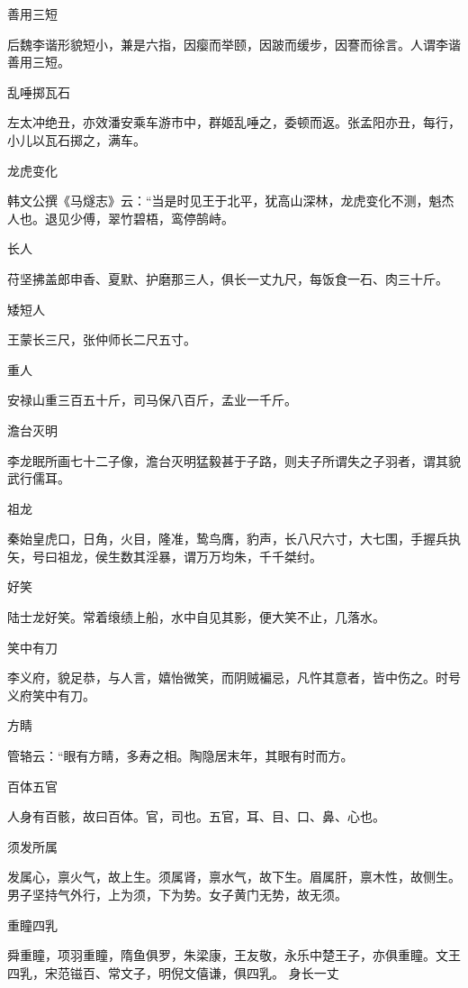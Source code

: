 \documentclass[a4paper,12pt,UTF8,twoside]{ctexbook}
\begin{document}
    善用三短
    
    后魏李谐形貌短小，兼是六指，因瘿而举颐，因跛而缓步，因謇而徐言。人谓李谐善用三短。
    
    乱唾掷瓦石
    
    左太冲绝丑，亦效潘安乘车游市中，群姬乱唾之，委顿而返。张孟阳亦丑，每行，小儿以瓦石掷之，满车。
    
    龙虎变化
    
    韩文公撰《马燧志》云：“当是时见王于北平，犹高山深林，龙虎变化不测，魁杰人也。退见少傅，翠竹碧梧，鸾停鹄峙。
    
    长人
    
    苻坚拂盖郎申香、夏默、护磨那三人，俱长一丈九尺，每饭食一石、肉三十斤。
    
    矮短人
    
    王蒙长三尺，张仲师长二尺五寸。
    
    重人
    
    安禄山重三百五十斤，司马保八百斤，孟业一千斤。
    
    澹台灭明
    
    李龙眠所画七十二子像，澹台灭明猛毅甚于子路，则夫子所谓失之子羽者，谓其貌武行儒耳。
    
    祖龙
    
    秦始皇虎口，日角，火目，隆准，鸷鸟膺，豹声，长八尺六寸，大七围，手握兵执矢，号曰祖龙，侯生数其淫暴，谓万万均朱，千千桀纣。
    
    好笑
    
    陆士龙好笑。常着缞绩上船，水中自见其影，便大笑不止，几落水。
    
    笑中有刀
    
    李义府，貌足恭，与人言，嬉怡微笑，而阴贼褊忌，凡忤其意者，皆中伤之。时号义府笑中有刀。
    
    方睛
    
    管辂云：“眼有方睛，多寿之相。陶隐居末年，其眼有时而方。
    
    百体五官
    
    人身有百骸，故曰百体。官，司也。五官，耳、目、口、鼻、心也。
    
    须发所属
    
    发属心，禀火气，故上生。须属肾，禀水气，故下生。眉属肝，禀木性，故侧生。男子坚持气外行，上为须，下为势。女子黄门无势，故无须。
    
    重瞳四乳
    
    舜重瞳，项羽重瞳，隋鱼俱罗，朱梁康，王友敬，永乐中楚王子，亦俱重瞳。文王四乳，宋范镃百、常文子，明倪文僖谦，俱四乳。
    身长一丈
    
\end{document}

